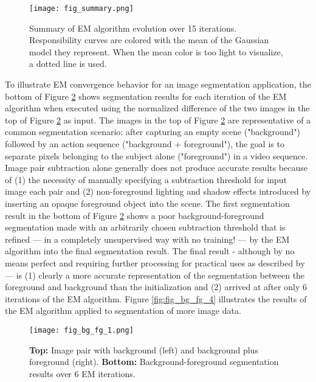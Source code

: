 \documentclass[conference]{IEEEtran}
\begin{document}
\begin{figure}[ht]
\centering
\texttt{[image: fig\_summary.png]}
\caption{Summary of EM algorithm evolution over 15 iterations. Responsibility curves are colored with the mean of the Gaussian model they represent. When the mean color is too light to visualize, a dotted line is used.}
\label{fig:fig_summary}
\vfill
\end{figure}

To illustrate EM convergence behavior for an image segmentation application, the bottom of Figure \ref{fig:fig_bg_fg_1} shows segmentation results for each iteration of the EM algorithm when executed using the normalized difference \cite{ColorDifference} of the two images in the top of Figure \ref{fig:fig_bg_fg_1} as input. The images in the top of Figure \ref{fig:fig_bg_fg_1} are representative of a common segmentation scenario: after capturing an empty scene ("background") followed by an action sequence ("background + foreground"), the goal is to separate pixels belonging to the subject alone ("foreground") in a video sequence. Image pair subtraction alone generally does not produce accurate results because of (1) the necessity of manually specifying a subtraction threshold for input image each pair and (2) non-foreground lighting and shadow effects introduced by inserting an opaque foreground object into the scene. The first segmentation result in the bottom of Figure \ref{fig:fig_bg_fg_1} shows a poor background-foreground segmentation made with an arbitrarily chosen subtraction threshold that is refined --- in a completely unsupervised way with no training! --- by the EM algorithm into the final segmentation result. The final result - although by no means perfect and requiring further processing for practical uses as described by \cite{GrabCut} --- is (1) clearly a more accurate representation of the segmentation between the foreground and background than the initialization and (2) arrived at after only 6 iterations of the EM algorithm. Figure \ref{fig:fig_bg_fg_4} illustrates the results of the EM algorithm applied to segmentation of more image data.

\begin{figure}[ht]
\centering
\texttt{[image: fig\_bg\_fg\_1.png]}
\caption{\textbf{Top:} Image pair with background (left) and background plus foreground (right). \textbf{Bottom:} Background-foreground segmentation results over 6 EM iterations.}
\label{fig:fig_bg_fg_1}
\vfill
\end{figure}
\end{document}
